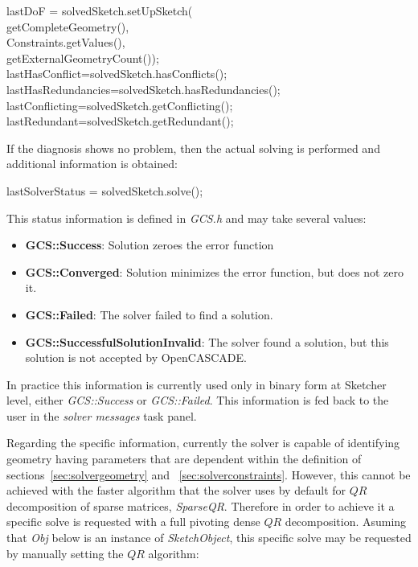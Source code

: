 \documentclass[12pt,twoside,a4paper]{book}
\newcommand{\SketchObject}{\emph{SketchObject}}
\begin{document}
    \begin{codequote}
        lastDoF = solvedSketch.setUpSketch(\\
        \-\hspace{2.5cm}getCompleteGeometry(),\\
        \-\hspace{2.5cm}Constraints.getValues(),\\
        \-\hspace{2.5cm}getExternalGeometryCount());\\

        lastHasConflict=solvedSketch.hasConflicts();\\
        lastHasRedundancies=solvedSketch.hasRedundancies();\\
        lastConflicting=solvedSketch.getConflicting();\\
        lastRedundant=solvedSketch.getRedundant();
    \end{codequote}

    If the diagnosis shows no problem, then the actual solving is performed and additional information is obtained:

    \begin{codequote}
        lastSolverStatus = solvedSketch.solve();
    \end{codequote}

    This status information is defined in \emph{GCS.h} and may take several values:

    \begin{itemize}
     \item \textbf{GCS::Success}: Solution zeroes the error function
     \item \textbf{GCS::Converged}: Solution minimizes the error function, but does not zero it.
     \item \textbf{GCS::Failed}: The solver failed to find a solution.
     \item \textbf{GCS::SuccessfulSolutionInvalid}: The solver found a solution, but this solution is not accepted by OpenCASCADE.
    \end{itemize}

    In practice this information is currently used only in binary form at Sketcher level, either \emph{GCS::Success} or \emph{GCS::Failed}. This information is fed back to the user in the \emph{solver messages} task panel.

    Regarding the specific information, currently the solver is capable of identifying geometry having parameters that are dependent within the definition of sections~\ref{sec:solvergeometry} and ~\ref{sec:solverconstraints}. However, this cannot be achieved with the faster algorithm that the solver uses by default for $QR$ decomposition of sparse matrices, \emph{SparseQR}. Therefore in order to achieve it a specific solve is requested with a full pivoting dense $QR$ decomposition. Asuming that \emph{Obj} below is an instance of \SketchObject{}, this specific solve may be requested by manually setting the $QR$ algorithm:
\end{document}
